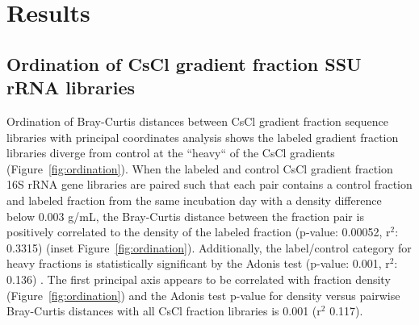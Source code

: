 \section{Results}
\subsection{Ordination of CsCl gradient fraction SSU rRNA libraries} Ordination
of Bray-Curtis \citep{Bray_1957} distances between CsCl gradient fraction
sequence libraries with principal coordinates analysis shows the labeled
gradient fraction libraries diverge from control at the ``heavy`` of the CsCl
gradients (Figure~\ref{fig:ordination}). When the labeled and control CsCl
gradient fraction 16S rRNA gene libraries are paired such that each pair
contains a control fraction and labeled fraction from the same incubation day
with a density difference below 0.003 g/mL, the Bray-Curtis distance between
the fraction pair is positively correlated to the density of the labeled
fraction (p-value: 0.00052, r$^{2}$: 0.3315) (inset
Figure~\ref{fig:ordination}).  Additionally, the label/control category for
heavy fractions is statistically significant by the Adonis test (p-value:
0.001, r$^{2}$: 0.136) \citep{Anderson_2001}. The first principal axis appears
to be correlated with fraction density (Figure~\ref{fig:ordination}) and the
Adonis test p-value for density versus pairwise Bray-Curtis distances with all
CsCl fraction libraries is 0.001 (r$^{2}$ 0.117).

